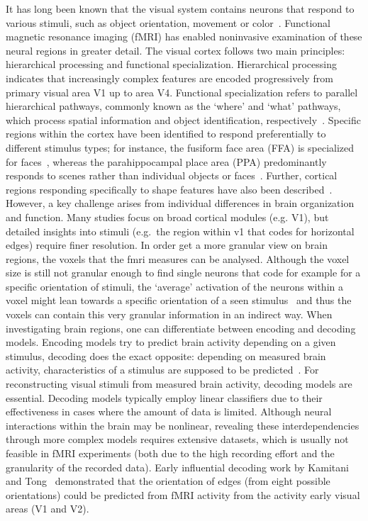 It has long been known that the visual system contains neurons that respond to various stimuli, such as object orientation, movement or color~\cite{grill-spectorHUMANVISUALCORTEX2004}. Functional magnetic resonance imaging (fMRI) has enabled noninvasive examination of these neural regions in greater detail. The visual cortex follows two main principles: hierarchical processing and functional specialization. Hierarchical processing indicates that increasingly complex features are encoded progressively from primary visual area V1 up to area V4. Functional specialization refers to parallel hierarchical pathways, commonly known as the `where' and `what' pathways, which process spatial information and object identification, respectively~\cite{grill-spectorHUMANVISUALCORTEX2004,ungerleiderWhatWhereHuman1994}. Specific regions within the cortex have been identified to respond preferentially to different stimulus types; for instance, the fusiform face area (FFA) is specialized for faces~\cite{kanwisherFusiformFaceArea1997}, whereas the parahippocampal place area (PPA) predominantly responds to scenes rather than individual objects or faces~\cite{epsteinCorticalRepresentationLocal1998}. Further, cortical regions responding specifically to shape features have also been described~\cite{kourtziCorticalRegionsInvolved2000}. However, a key challenge arises from individual differences in brain organization and function. Many studies focus on broad cortical modules (e.g. V1), but detailed insights into stimuli (e.g.\ the region within v1 that codes for horizontal edges) require finer resolution. In order get a more granular view on brain regions, the voxels that the fmri measures can be analysed. Although the voxel size is still not granular enough to find single neurons that code for example for a specific orientation of stimuli, the `average' activation of the neurons within a voxel might lean towards a specific orientation of a seen stimulus~\cite{kamitaniDecodingVisualSubjective2005} and thus the voxels can contain this very granular information in an indirect way. When investigating brain regions, one can differentiate between encoding and decoding models. Encoding models try to predict brain activity depending on a given stimulus, decoding does the exact opposite: depending on measured brain activity, characteristics of a stimulus are supposed to be predicted~\cite{naselarisEncodingDecodingFMRI2011}. For reconstructing visual stimuli from measured brain activity, decoding models are essential. Decoding models typically employ linear classifiers due to their effectiveness in cases where the amount of data is limited. Although neural interactions within the brain may be nonlinear, revealing these interdependencies through more complex models requires extensive datasets, which is usually not feasible in fMRI experiments (both due to the high recording effort and the granularity of the recorded data). Early influential decoding work by Kamitani and Tong~\cite{kamitaniDecodingVisualSubjective2005} demonstrated that the orientation of edges (from eight possible orientations) could be predicted from fMRI activity from the activity early visual areas (V1 and V2). 
